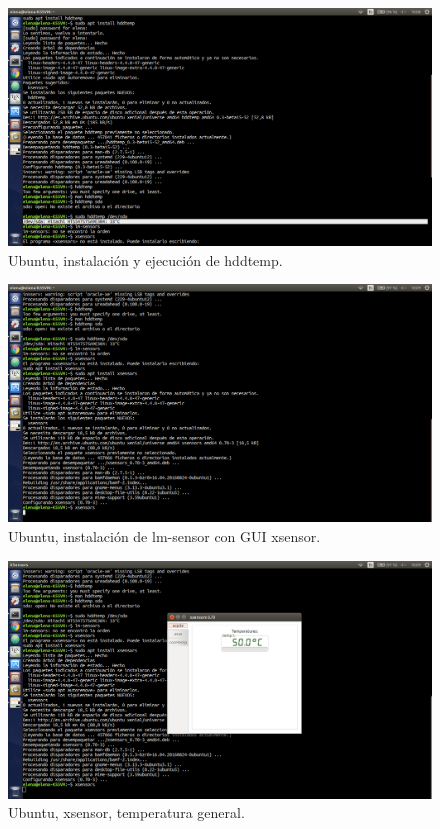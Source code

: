 \begin{figure}[H] 
	\centering
	\includegraphics[width=14.7cm]{./img/extra_1_1.png} 	
	\caption{Ubuntu, instalación y ejecución de hddtemp.} \label{fig:extra_1_1}
\end{figure}

\begin{figure}[H] 
	\centering
	\includegraphics[width=14.7cm]{./img/extra_1_2.png} 	
	\caption{Ubuntu, instalación de lm-sensor con GUI xsensor.} \label{fig:extra_1_2}
\end{figure}

\begin{figure}[H] 
	\centering
	\includegraphics[width=14.7cm]{./img/extra_1_3.png} 	
	\caption{Ubuntu, xsensor, temperatura general.} \label{fig:extra_1_3}
\end{figure}

